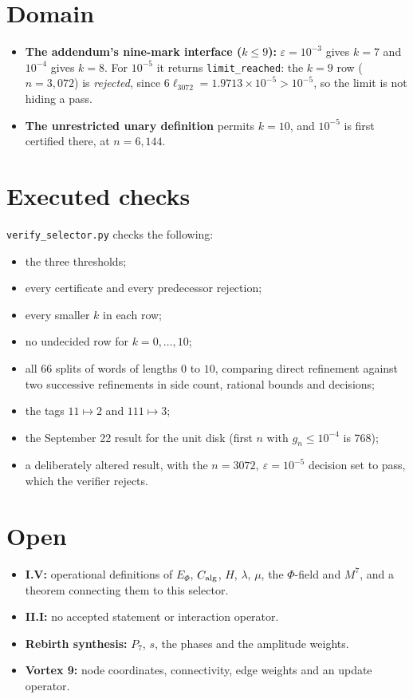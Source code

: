 \documentclass[11pt]{article}
\theoremstyle{definition}
\theoremstyle{remark}
\begin{document}
\section{Domain}
\begin{itemize}
\item \textbf{The addendum's nine-mark interface ($k\le 9$):} $\varepsilon=10^{-3}$ gives $k=7$ and $10^{-4}$ gives $k=8$.
For $10^{-5}$ it returns \texttt{limit\_reached}: the $k=9$ row ($n=3{,}072$) is \emph{rejected}, since
$6\ell_{3072}=1.9713\times10^{-5}>10^{-5}$, so the limit is not hiding a pass.
\item \textbf{The unrestricted unary definition} permits $k=10$, and $10^{-5}$ is first certified there, at $n=6{,}144$.
\end{itemize}

\section{Executed checks}
\texttt{verify\_selector.py} checks the following:
\begin{itemize}
\item the three thresholds;
\item every certificate and every predecessor rejection;
\item every smaller $k$ in each row;
\item no undecided row for $k=0,\dots,10$;
\item all 66 splits of words of lengths $0$ to $10$, comparing direct refinement against two successive refinements in
side count, rational bounds and decisions;
\item the tags $11\mapsto2$ and $111\mapsto3$;
\item the September 22 result for the unit disk (first $n$ with $g_n\le10^{-4}$ is 768);
\item a deliberately altered result, with the $n=3072,\ \varepsilon=10^{-5}$ decision set to pass, which the verifier
rejects.
\end{itemize}

\section*{Open}
\begin{itemize}
\item \textbf{I.V:} operational definitions of $E_\Phi$, $C_{\rm alg}$, $H$, $\lambda$, $\mu$, the $\Phi$-field and
$M^7$, and a theorem connecting them to this selector.
\item \textbf{II.I:} no accepted statement or interaction operator.
\item \textbf{Rebirth synthesis:} $P_7$, $s$, the phases and the amplitude weights.
\item \textbf{Vortex 9:} node coordinates, connectivity, edge weights and an update operator.
\end{itemize}
\end{document}
